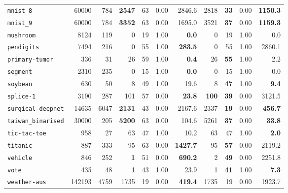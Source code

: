 \begin{tabular}{lccrrrrrrrr}
\texttt{mnist\_8} & \multicolumn{1}{r}{60000} & \multicolumn{1}{r}{784}  & \textbf{2547} & 63 & 0.00 & 2846.6 & 2818 & \textbf{33} & 0.00 & \textbf{1150.3}\\
\texttt{mnist\_9} & \multicolumn{1}{r}{60000} & \multicolumn{1}{r}{784}  & \textbf{3352} & 63 & 0.00 & 1695.0 & 3521 & \textbf{37} & 0.00 & \textbf{1159.3}\\
\texttt{mushroom} & \multicolumn{1}{r}{8124} & \multicolumn{1}{r}{119}  & 0 & 19 & 1.00 & \textbf{0.0} & 0 & 19 & 1.00 & 0.0\\
\texttt{pendigits} & \multicolumn{1}{r}{7494} & \multicolumn{1}{r}{216}  & 0 & 55 & 1.00 & \textbf{283.5} & 0 & 55 & 1.00 & 2860.1\\
\texttt{primary-tumor} & \multicolumn{1}{r}{336} & \multicolumn{1}{r}{31}  & 26 & 59 & 1.00 & \textbf{0.4} & 26 & \textbf{55} & 1.00 & 2.2\\
\texttt{segment} & \multicolumn{1}{r}{2310} & \multicolumn{1}{r}{235}  & 0 & 15 & 1.00 & \textbf{0.0} & 0 & 15 & 1.00 & 0.0\\
\texttt{soybean} & \multicolumn{1}{r}{630} & \multicolumn{1}{r}{50}  & 8 & 49 & 1.00 & 19.6 & 8 & \textbf{47} & 1.00 & \textbf{9.4}\\
\texttt{splice-1} & \multicolumn{1}{r}{3190} & \multicolumn{1}{r}{287}  & 101 & 57 & 0.00 & \textbf{23.8} & \textbf{100} & \textbf{39} & 0.00 & 3121.5\\
\texttt{surgical-deepnet} & \multicolumn{1}{r}{14635} & \multicolumn{1}{r}{6047}  & \textbf{2131} & 43 & 0.00 & 2167.6 & 2337 & \textbf{19} & 0.00 & \textbf{456.7}\\
\texttt{taiwan\_binarised} & \multicolumn{1}{r}{30000} & \multicolumn{1}{r}{205}  & \textbf{5200} & 63 & 0.00 & 104.6 & 5261 & \textbf{37} & 0.00 & \textbf{33.8}\\
\texttt{tic-tac-toe} & \multicolumn{1}{r}{958} & \multicolumn{1}{r}{27}  & 63 & 47 & 1.00 & 10.2 & 63 & 47 & 1.00 & \textbf{2.0}\\
\texttt{titanic} & \multicolumn{1}{r}{887} & \multicolumn{1}{r}{333}  & 95 & 63 & 0.00 & \textbf{1427.7} & 95 & \textbf{57} & 0.00 & 2119.2\\
\texttt{vehicle} & \multicolumn{1}{r}{846} & \multicolumn{1}{r}{252}  & \textbf{1} & 51 & 0.00 & \textbf{690.2} & 2 & \textbf{49} & 0.00 & 2251.8\\
\texttt{vote} & \multicolumn{1}{r}{435} & \multicolumn{1}{r}{48}  & 1 & 43 & 1.00 & 23.9 & 1 & \textbf{41} & 1.00 & \textbf{7.3}\\
\texttt{weather-aus} & \multicolumn{1}{r}{142193} & \multicolumn{1}{r}{4759}  & 1735 & 19 & 0.00 & \textbf{419.4} & 1735 & 19 & 0.00 & 1923.7\\

\end{tabular}
